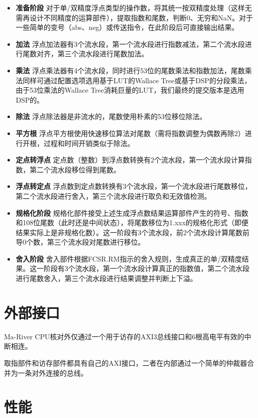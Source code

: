 \begin{itemize}
    \item \textbf{准备阶段} \quad 对于单/双精度浮点类型的操作数，将其统一按双精度处理（这样无需再设计不同精度的运算部件），提取指数和尾数，判断0、无穷和NaN。对于一些简单的变号（abs、neg）或传送指令，在此阶段后可直接输出结果。
    \item \textbf{加法} \quad 浮点加法器有3个流水段，第一个流水段进行指数减法，第二个流水段进行尾数对齐，第三个流水段进行尾数加法。
    \item \textbf{乘法} \quad 浮点乘法器有4个流水段，同时进行53位的尾数乘法和指数加法，尾数乘法同样可通过配置选项选用基于LUT的Wallace Tree或基于DSP的分段乘法，由于53位乘法的Wallace Tree消耗巨量的LUT，我们最终的提交版本是选用DSP的。
    \item \textbf{除法} \quad 浮点除法器是非流水的，尾数使用朴素的53位移位除法。
    \item \textbf{平方根} \quad 浮点平方根使用快速移位算法对尾数（需将指数调整为偶数再除2）进行开根，过程和时间开销类似于除法。
    \item \textbf{定点转浮点} \quad 定点数（整数）到浮点数转换有2个流水段，第一个流水段计算指数，第二个流水段移位得到尾数。
    \item \textbf{浮点转定点} \quad 浮点数到定点数转换有3个流水段，第一个流水段进行尾数移位，第二个流水段进行舍入，第三个流水段进行取负和无效值检测。
    \item \textbf{规格化阶段} \quad 规格化部件接受上述生成浮点数结果运算部件产生的符号、指数和108位尾数（此时还是中间状态），将尾数移位为1.xxx的规格化形式（即便结果实际上是非规格化数）。这一阶段有3个流水段，前2个流水段计算尾数前导0个数，第三个流水段对尾数进行移位。
    \item \textbf{舍入阶段} \quad 舍入部件根据FCSR.RM指示的舍入规则，生成真正的单/双精度结果。这一阶段有3个流水段，第一个流水段计算真正的指数值，第二个流水段进行尾数舍入，第三个流水段进行结果调整并判断上下溢。
\end{itemize}

\section{外部接口}

Ma-River CPU核对外仅通过一个用于访存的AXI3总线接口和6根高电平有效的中断相连。

取指部件和访存部件都具有自己的AXI接口，二者在内部通过一个简单的仲裁器合并为一条对外连接的总线。

\section{性能}

